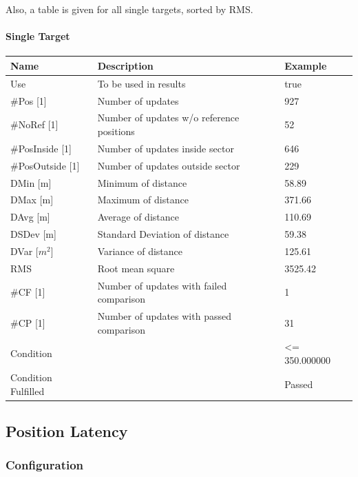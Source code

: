 Also, a table is given for all single targets, sorted by RMS.

\paragraph{Single Target}

\begin{center}
 \begin{table}[H]
  \begin{tabularx}{\textwidth}{ | l | X |  l | }
    \hline
    \textbf{Name} & \textbf{Description} & \textbf{Example} \\ \hline
    Use & To be used in results & true \\ \hline
    \#Pos [1] & Number of updates & 927 \\ \hline
    \#NoRef [1] & Number of updates w/o reference positions & 52 \\ \hline
    \#PosInside [1] & Number of updates inside sector & 646 \\ \hline
    \#PosOutside [1] & Number of updates outside sector & 229 \\ \hline
    DMin [m] & Minimum of distance & 58.89 \\ \hline
    DMax [m] & Maximum of distance & 371.66 \\ \hline
    DAvg [m] & Average of distance & 110.69 \\ \hline
    DSDev [m] & Standard Deviation of distance & 59.38 \\ \hline
    DVar [$m^2$] & Variance of distance & 125.61 \\ \hline
    RMS & Root mean square & 3525.42 \\ \hline
    \#CF [1] & Number of updates with failed comparison & 1 \\ \hline
    \#CP [1] & Number of updates with passed comparison & 31 \\ \hline
    Condition &  & <= 350.000000 \\ \hline
    Condition Fulfilled &  & Passed \\ \hline
\end{tabularx}
\end{table}
\end{center}

\subsection{Position Latency}
\label{sec:eval_req_pos_latency} 

\subsubsection{Configuration}

